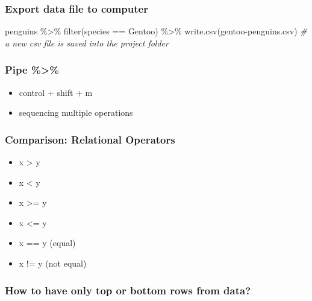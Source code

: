 \documentclass[
]{article}
\newenvironment{Shaded}{\begin{snugshade}}{\end{snugshade}}
\newcommand{\CommentTok}[1]{\textcolor[rgb]{0.56,0.35,0.01}{\textit{#1}}}
\newcommand{\FunctionTok}[1]{\textcolor[rgb]{0.00,0.00,0.00}{#1}}
\newcommand{\NormalTok}[1]{#1}
\newcommand{\SpecialCharTok}[1]{\textcolor[rgb]{0.00,0.00,0.00}{#1}}
\newcommand{\StringTok}[1]{\textcolor[rgb]{0.31,0.60,0.02}{#1}}
\providecommand{\tightlist}{%
  \setlength{\itemsep}{0pt}\setlength{\parskip}{0pt}}
\begin{document}
\hypertarget{export-data-file-to-computer}{%
\subsubsection{Export data file to
computer}\label{export-data-file-to-computer}}

\begin{Shaded}
\begin{Highlighting}[]
\NormalTok{penguins }\SpecialCharTok{\%\textgreater{}\%} 
  \FunctionTok{filter}\NormalTok{(species }\SpecialCharTok{==} \StringTok{\textquotesingle{}Gentoo\textquotesingle{}}\NormalTok{) }\SpecialCharTok{\%\textgreater{}\%} 
  \FunctionTok{write.csv}\NormalTok{(}\StringTok{\textquotesingle{}gentoo{-}penguins.csv\textquotesingle{}}\NormalTok{)}
\CommentTok{\# a new csv file is saved into the project folder}
\end{Highlighting}
\end{Shaded}

\hypertarget{pipe}{%
\subsubsection{Pipe \%\textgreater\%}\label{pipe}}

\begin{itemize}
\tightlist
\item
  control + shift + m
\item
  sequencing multiple operations
\end{itemize}

\hypertarget{comparison-relational-operators}{%
\subsubsection{Comparison: Relational
Operators}\label{comparison-relational-operators}}

\begin{itemize}
\tightlist
\item
  x \textgreater{} y
\item
  x \textless{} y
\item
  x \textgreater= y
\item
  x \textless= y
\item
  x == y (equal)
\item
  x != y (not equal)
\end{itemize}

\hypertarget{how-to-have-only-top-or-bottom-rows-from-data}{%
\subsubsection{How to have only top or bottom rows from
data?}\label{how-to-have-only-top-or-bottom-rows-from-data}}
\end{document}
